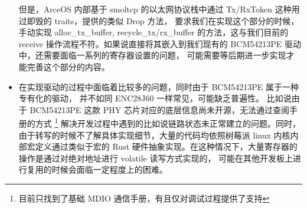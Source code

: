 \begin{itemize}
        但是，ArceOS 内部基于 smoltcp 的以太网协议栈中通过 Tx/RxToken 这种用过即毁的 traits，提供的类似 Drop 方法，
        要求我们在实现这个部分的时候，手动实现 alloc\_tx\_buffer, recycle\_tx/rx\_buffer 的方法，这与我们目前的
        receive 操作流程不符。如果说直接将其嵌入到我们现有的 BCM54213PE 驱动中，还需要面临一系列的寄存器设置的问题，
        可能需要等后期进一步实现才能完善这个部分的内容。

        \item 在实现驱动的过程中面临着比较多的问题，同时由于 BCM54213PE 属于一种专有化的驱动，
        并不如同 ENC28J60 一样常见，可能缺乏普遍性。
        比如说由于 BCM54213PE 这款 PHY 芯片对应的底层信息尚未开源，无法通过查阅手册的方式
        \footnote{目前只找到了基础 MDIO 通信手册，有且仅对调试过程提供了支持}
        解决开发过程中遇到的比如说链路状态未正常建立的问题。同时，由于转写的时候不了解具体实现细节，大量的代码均依照树莓派 linux
        内核内部宏定义通过类似于宏的 Rust 硬件抽象实现。在这种情况下，大量寄存器的操作是通过对绝对地址进行 volatile 读写方式实现的，
        可能在其他开发板上进行复用的时候会面临一定程度上的困难。
    \end{itemize}
